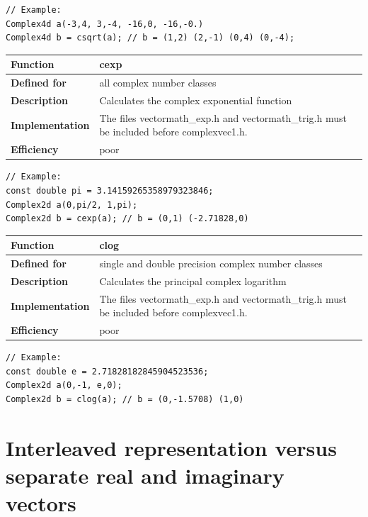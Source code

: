 \documentclass[11pt,a4paper,oneside,openright]{report}
\newcommand{\vspacesmall}{\vspace{3mm}}
\newcommand{\vspacebig}{\vspace{6mm}}
\begin{document}
\begin{lstlisting}[frame=none]
// Example:
Complex4d a(-3,4, 3,-4, -16,0, -16,-0.)
Complex4d b = csqrt(a); // b = (1,2) (2,-1) (0,4) (0,-4);
\end{lstlisting}
\vspacebig


\begin{tabular}{|p{28mm}|p{100mm}|}
\hline
\bfseries Function & cexp \\ \hline
\bfseries Defined for & all complex number classes  \\ \hline
\bfseries Description & Calculates the complex exponential function \\ \hline
\bfseries Implementation & The files vectormath\_exp.h and vectormath\_trig.h
must be included before complexvec1.h. \\ \hline
\bfseries Efficiency & poor \\ \hline
\end{tabular}
\vspacesmall

\begin{lstlisting}[frame=none]
// Example:
const double pi = 3.14159265358979323846;
Complex2d a(0,pi/2, 1,pi);
Complex2d b = cexp(a); // b = (0,1) (-2.71828,0)
\end{lstlisting}
\vspacebig


\begin{tabular}{|p{28mm}|p{100mm}|}
\hline
\bfseries Function & clog \\ \hline
\bfseries Defined for & single and double precision complex number classes  \\ \hline
\bfseries Description & Calculates the principal complex logarithm \\ \hline
\bfseries Implementation & The files vectormath\_exp.h and vectormath\_trig.h
must be included before complexvec1.h. \\ \hline
\bfseries Efficiency & poor \\ \hline
\end{tabular}
\vspacesmall

\begin{lstlisting}[frame=none]
// Example:
const double e = 2.71828182845904523536;
Complex2d a(0,-1, e,0);
Complex2d b = clog(a); // b = (0,-1.5708) (1,0)
\end{lstlisting}
\vspacebig



\chapter{Interleaved representation versus separate real and imaginary vectors}\label{chap:InterleavedVsSeparate}
\end{document}
